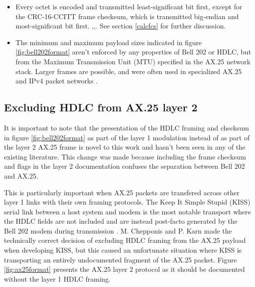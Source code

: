 \documentclass[12pt,letterpaper]{article}
\begin{document}
\begin{itemize}
		This is done by ``bit-stuffing" the transmitted bitsteam by
		appending a zero after any string of five ones at the transmitter,
		and subsequently dropping this zero following five ones at the 
		receiver.\footnote{Six ones in a row represent a 0x7E flag indicating 
			the end of a frame or an idle carrier.
			Seven or more ones in a row indicate an invalid channel state
			that shouldn't happen, but regularly does, so modems must be 
			able to handle arbitrary strings of ones gracefully.}
	\item Every octet is encoded and transmitted least-significant bit first,
		except for the CRC-16-CCITT frame checksum, 
		which is transmitted big-endian
		and most-significant bit first.
		\cite{n1vgphy},\cite[\S8.1.1-2]{ituv42},\cite[\S3.8]{ax25spec}.
		See section \ref{calcfcs} for further discussion.
	\item The minimum and maximum payload sizes indicated in figure 
		\ref{fig:bell202format} aren't enforced by any properties of 
		Bell 202 or HDLC, but from the Maximum Transmission Unit (MTU)
		specified in the AX.25 network stack.
		Larger frames are possible, and were often used in specialized 
		AX.25 and IPv4 packet networks \cite{pattersoninterview}.

\end{itemize}

\subsection{Excluding HDLC from AX.25 layer 2}

It is important to note that the presentation of the HDLC framing
and checksum
in figure \ref{fig:bell202format} as part of the layer 1 modulation 
instead of as part of the layer 2 AX.25 frame is 
novel to this work and hasn't been seen in any of the existing literature.
This change was made because including the frame checksum and flags
in the layer 2 documentation confuses the separation between Bell 202 
and AX.25. 

This is particularly important when AX.25 packets are transfered across 
other layer 1 links with their own framing protocols.
The Keep It Simple Stupid (KISS) serial link between 
a host system and modem is the most notable
transport where the HDLC fields are not included and are instead 
post-facto generated by the Bell 202 modem during transmission \cite{KISSspec}.
M. Chepponis and P. Karn made the technically correct decision of excluding 
HDLC framing from the AX.25 payload when developing KISS, but this caused
an unfortunate situation where KISS is transporting an entirely
undocumented fragment of the AX.25 packet. Figure \ref{fig:ax25format} 
presents the AX.25 layer 2 protocol as it should be documented without
the layer 1 HDLC framing.
\end{document}
